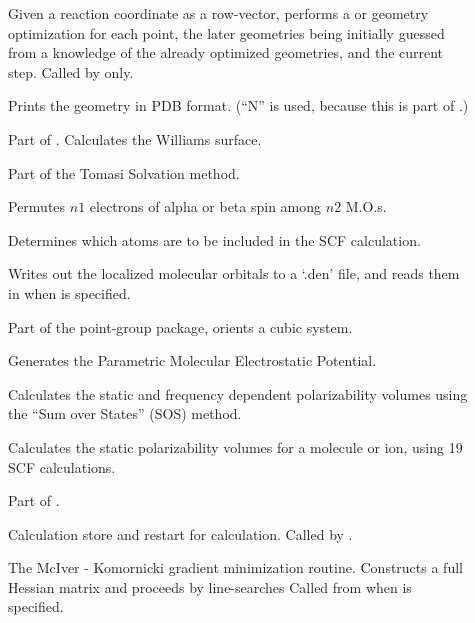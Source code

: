\begin{description}
\item[] Given a reaction coordinate as a row-vector,  
performs a  or  geometry optimization for each point, the
later geometries being initially guessed from a knowledge of the already
optimized geometries, and the current step. Called by  only.

\item[] Prints the geometry in PDB format. (``N'' is used, because
this is part of .)

\item[] Part of . Calculates the Williams surface.

\item[] Part of the Tomasi Solvation method.

\item[] Permutes $n1$ electrons of alpha or beta spin among $n2$
   M.O.s. 

\item[] Determines which atoms are to be included in the SCF
calculation.

\item[] Writes out the localized molecular orbitals to a 
`.den' file, and reads them in when  is specified.

\item[] Part of the point-group package,  orients a
 cubic system.

\item[] Generates the Parametric Molecular
Electrostatic Potential.

\item[] Calculates the static and frequency dependent
polarizability volumes using the ``Sum over States'' (SOS) method.

\item[] Calculates the static polarizability volumes  for a
molecule or ion, using 19 SCF calculations.

\item[] Part of .

\item[] Calculation store and restart for  
calculation. Called by .

\item[] The McIver - Komornicki gradient  minimization
routine. Constructs a full Hessian matrix  and proceeds by line-searches Called
from  when   is specified.


\end{description}
